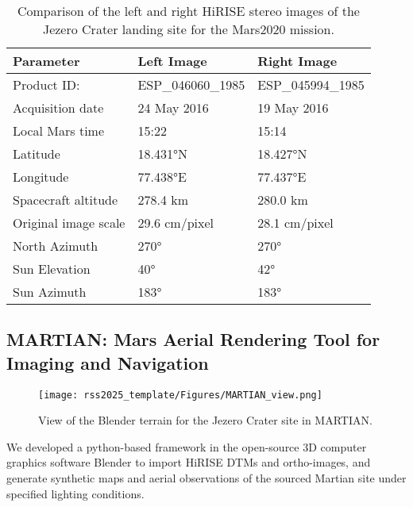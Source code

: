 \begin{table}
\centering
\begin{tabular}{l l l}
\textbf{Parameter}                 & \textbf{Left Image}                   & \textbf{Right Image}                   \\ \hline
Product ID: & ESP\_046060\_1985 & ESP\_045994\_1985 \\
Acquisition date           & 24 May 2016                            & 19 May 2016                            \\ 
Local Mars time            & 15:22                                  & 15:14                                  \\ 
Latitude        & 18.431°N                                & 18.427°N                                \\
Longitude           & 77.438°E                                & 77.437°E                                \\ 
Spacecraft altitude        & 278.4 km                 & 280.0 km                \\
Original image scale & 29.6 cm/pixel  & 28.1 cm/pixel   \\
North Azimuth & 270° & 270° \\
Sun Elevation      & 40°  & 42°  \\ 
Sun Azimuth        & 183°                                   & 183°                                   \\ \hline
\end{tabular}
\caption{\label{tab:hirise_stereo}Comparison of the left and right HiRISE stereo images of the Jezero Crater landing site for the Mars2020 mission.}
\end{table}

\subsection{\label{subsec:MARTIAN}MARTIAN: Mars Aerial Rendering Tool for Imaging and Navigation}

\begin{figure}
    \centering
    \texttt{[image: rss2025\_template/Figures/MARTIAN\_view.png]}  \caption{\label{fig:MARTIAN_view}View of the Blender terrain for the Jezero Crater site in MARTIAN.}
\end{figure}

We developed a python-based framework in the open-source 3D computer graphics software Blender to import HiRISE DTMs and ortho-images, and generate synthetic maps and aerial observations of the sourced Martian site under specified lighting conditions.

